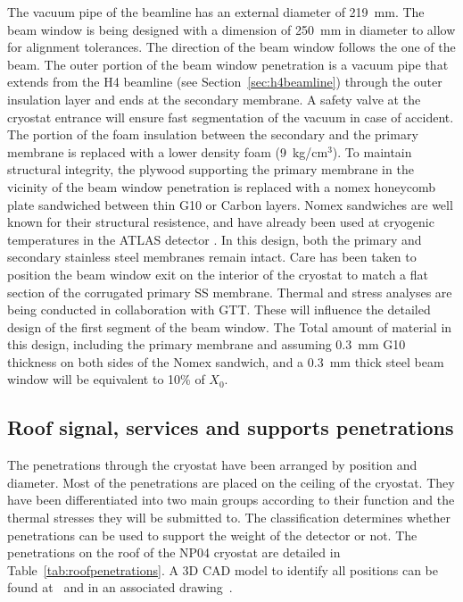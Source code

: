   The vacuum pipe of the beamline has an external diameter of 219~mm. The beam window is being designed with a dimension of 250~mm in diameter to allow for alignment tolerances.  The direction of the beam window follows the one of the beam.
The outer portion of the
beam window penetration is a vacuum pipe that extends from the H4 beamline (see Section~\ref{sec:h4beamline})  through the outer insulation layer and ends at the secondary
membrane. A safety valve at the cryostat entrance will ensure fast segmentation of the vacuum in case of accident.   The
portion of the foam insulation between the secondary and the primary
membrane is replaced with a lower density foam (9~kg/cm$^3$).
To maintain structural integrity, the plywood supporting
the primary membrane in the vicinity of the beam window penetration is
replaced with a nomex honeycomb plate  sandwiched between thin G10 or Carbon layers. Nomex sandwiches are well known for their structural resistence, and have already been used at cryogenic temperatures in  the ATLAS detector .
 In this design, both the
primary and secondary stainless steel membranes remain intact. Care has been taken to position the beam window exit on the interior of the cryostat to match a flat section of the corrugated primary SS membrane.
Thermal and stress analyses are being conducted in collaboration with GTT. These will influence the detailed design of the first segment of the beam window. 
The Total amount of material in this design, including the primary membrane and assuming 0.3~mm G10 thickness on both sides of the Nomex sandwich, and a 0.3~mm thick steel beam window will be equivalent to 10\% of $X_0$. 

\subsection{Roof signal, services and supports penetrations}

The penetrations through the cryostat have been arranged by position and diameter. %
Most of the penetrations are placed on the ceiling of the cryostat. They have been differentiated into two main groups according to their function and the thermal stresses they will be submitted to. The classification determines whether penetrations can be used to support the weight of the detector or not.
The penetrations on the roof of the NP04 cryostat are detailed in Table~\ref{tab:roofpenetrations}.  
A 3D CAD model to identify all positions can be found at~\cite{edms4} and in an associated drawing~\cite{edms5}.


